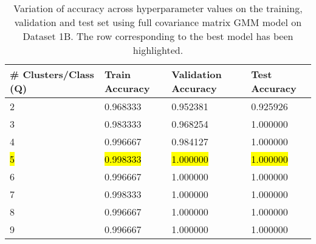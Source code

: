 \begin{table}[H]
\centering
\begin{tabular}{l l l l}
\hline
\hline
\textbf{\# Clusters/Class (Q)} & \textbf{Train Accuracy} & \textbf{Validation Accuracy} & \textbf{Test Accuracy}\\
\hline
\hline
2 & 0.968333 & 0.952381 & 0.925926 \\
3 & 0.983333 & 0.968254 & 1.000000 \\
4 & 0.996667 & 0.984127 & 1.000000 \\
\hl{5} & \hl{0.998333} & \hl{1.000000} & \hl{1.000000} \\
6 & 0.996667 & 1.000000 & 1.000000 \\
7 & 0.998333 & 1.000000 & 1.000000 \\
8 & 0.996667 & 1.000000 & 1.000000 \\
9 & 0.996667 & 1.000000 & 1.000000 \\
\hline
\end{tabular}
\caption{Variation of accuracy across hyperparameter values on the training, validation and test set using full covariance matrix GMM model on Dataset 1B. The row corresponding to the best model has been highlighted.}
\label{tab:1b_full}
\end{table}
